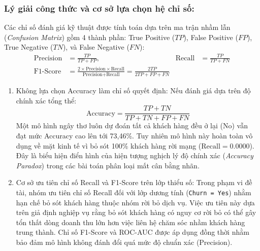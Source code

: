 \documentclass[a4paper]{article}
\begin{document}
\subsubsection*{\textbf{Lý giải công thức và cơ sở lựa chọn hệ chỉ số:}}
{
\setlength{\abovedisplayskip}{4pt}
\setlength{\belowdisplayskip}{4pt}
\setlength{\abovedisplayshortskip}{2pt}
\setlength{\belowdisplayshortskip}{2pt}
Các chỉ số đánh giá kỹ thuật được tính toán dựa trên ma trận nhầm lẫn (\textit{Confusion Matrix}) gồm 4 thành phần: True Positive ($TP$), False Positive ($FP$), True Negative ($TN$), và False Negative ($FN$):
\begin{align}
    \text{Precision} &= \frac{TP}{TP + FP}, & \text{Recall} &= \frac{TP}{TP + FN} \\
    \text{F1-Score} &= \frac{2 \times \text{Precision} \times \text{Recall}}{\text{Precision} + \text{Recall}} = \frac{2TP}{2TP + FP + FN}
\end{align}

\begin{enumerate}
    \item Không lựa chọn Accuracy làm chỉ số quyết định: Nếu đánh giá dựa trên độ chính xác tổng thể:
    \begin{equation}
        \text{Accuracy} = \frac{TP + TN}{TP + TN + FP + FN}
    \end{equation}
    Một mô hình ngây thơ luôn dự đoán tất cả khách hàng đều ở lại (No) vẫn đạt mức Accuracy cao lên tới 73,46\%. Tuy nhiên mô hình này hoàn toàn vô dụng về mặt kinh tế vì bỏ sót 100\% khách hàng rời mạng ($\text{Recall} = 0.0000$). Đây là biểu hiện điển hình của hiện tượng nghịch lý độ chính xác (\textit{Accuracy Paradox}) trong các bài toán phân loại mất cân bằng nhãn.
    
    \item Cơ sở ưu tiên chỉ số Recall và F1-Score trên lớp thiểu số: Trong phạm vi đề tài, nhóm ưu tiên chỉ số Recall đối với lớp dương tính (\texttt{Churn = Yes}) nhằm hạn chế bỏ sót khách hàng thuộc nhóm rời bỏ dịch vụ. Việc ưu tiên này dựa trên giả định nghiệp vụ rằng bỏ sót khách hàng có nguy cơ rời bỏ có thể gây tổn thất dòng doanh thu lớn hơn việc liên hệ chăm sóc nhầm khách hàng trung thành. Chỉ số F1-Score và ROC-AUC được áp dụng đồng thời nhằm bảo đảm mô hình không đánh đổi quá mức độ chuẩn xác (Precision).
\end{enumerate}

\vspace{1.5em}
}
\end{document}
